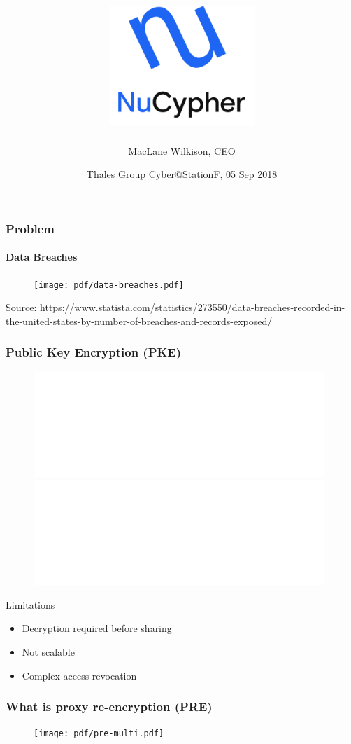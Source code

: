 \documentclass[xetex,mathsans,sans,aspectratio=169]{beamer}
\title[NuCypher]{\includegraphics[width=5.5cm]{pdf/nucypher_logo.pdf}}
\author[MacLane]{MacLane Wilkison, CEO}
\date[05 Sep 2018]{Thales Group Cyber@StationF, 05 Sep 2018}
\begin{document}
    \begin{frame}
        \titlepage
    \end{frame}

    \begin{frame}
      \frametitle{Problem}
      \framesubtitle{Data Breaches}
        \begin{figure}
            \centering
            \texttt{[image: pdf/data-breaches.pdf]}
        \end{figure}

        {\tiny Source: \url{https://www.statista.com/statistics/273550/data-breaches-recorded-in-the-united-states-by-number-of-breaches-and-records-exposed/} \par}
    \end{frame}

%

    \begin{frame}
        \frametitle{Public Key Encryption (PKE)}
        \begin{figure}
            \centering
            \includegraphics<1>[width=11cm]{pdf/pke-multi.pdf}
            \includegraphics<2>[width=11cm]{pdf/pke-multi-hack.pdf}
        \end{figure}

        Limitations
        \begin{itemize}
            \item Decryption required before sharing
            \item Not scalable
            \item Complex access revocation
        \end{itemize}
    \end{frame}

    \begin{frame}
        \frametitle{What is proxy re-encryption (PRE)}
        \begin{figure}
            \centering
            \texttt{[image: pdf/pre-multi.pdf]}
        \end{figure}
    \end{frame}
\end{document}
